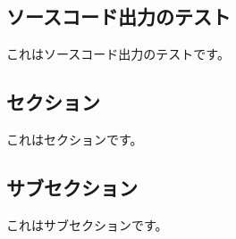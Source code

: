 	\newpage
	\subsection{ソースコード出力のテスト}
		これはソースコード出力のテストです。
		\begin{soucecode}[language=TeX,caption=ソースコード出力のテスト,label=lst:test]

\section{セクション}
	これはセクションです。

	\subsection{サブセクション}
		これはサブセクションです。

		\end{soucecode}


